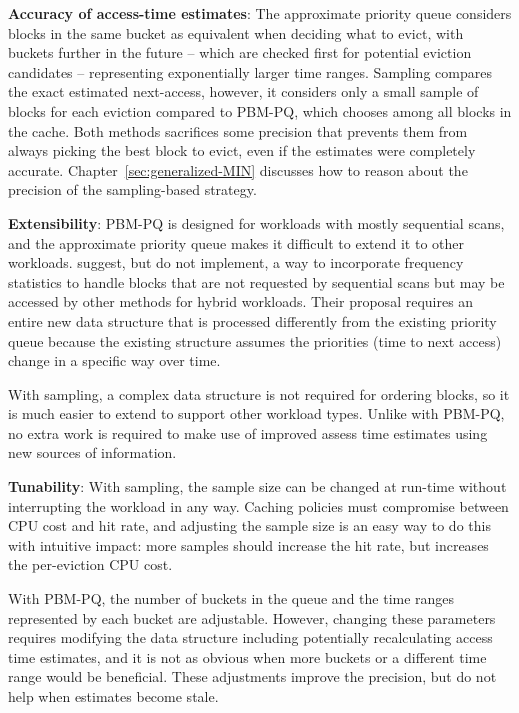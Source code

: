 \textbf{Accuracy of access-time estimates}: The approximate priority queue considers blocks in the same bucket as equivalent when deciding what to evict, with buckets further in the future -- which are checked first for potential eviction candidates -- representing exponentially larger time ranges. Sampling compares the exact estimated next-access, however, it considers only a small sample of blocks for each eviction compared to PBM-PQ, which chooses among all blocks in the cache. Both methods sacrifices some precision that prevents them from always picking the best block to evict, even if the estimates were completely accurate. Chapter~\ref{sec:generalized-MIN} discusses how to reason about the precision of the sampling-based strategy.  %

\textbf{Extensibility}: PBM-PQ is designed for workloads with mostly sequential scans, and the approximate priority queue makes it difficult to extend it to other workloads. \citet{pbm} suggest, but do not implement, a way to incorporate frequency statistics to handle blocks that are not requested by sequential scans but may be accessed by other methods for hybrid workloads. Their proposal requires an entire new data structure that is processed differently from the existing priority queue because the existing structure assumes the priorities (time to next access) change in a specific way over time. 

With sampling, a complex data structure is not required for ordering blocks, so it is much easier to extend to support other workload types. Unlike with PBM-PQ, no extra work is required to make use of improved assess time estimates using new sources of information.

\textbf{Tunability}: With sampling, the sample size can be changed at run-time without interrupting the workload in any way. Caching policies must compromise between CPU cost and hit rate, and adjusting the sample size is an easy way to do this with intuitive impact: more samples should increase the hit rate, but increases the per-eviction CPU cost.

With PBM-PQ, the number of buckets in the queue and the time ranges represented by each bucket are adjustable. However, changing these parameters requires modifying the data structure including potentially recalculating access time estimates, and it is not as obvious when more buckets or a different time range would be beneficial. These adjustments improve the precision, but do not help when estimates become stale.


